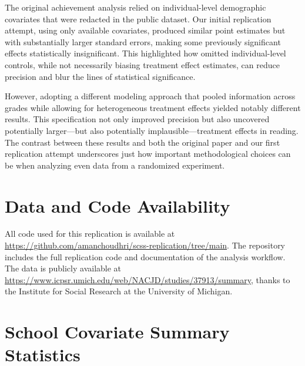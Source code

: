 \documentclass[11pt]{article}
\begin{document}
The original achievement analysis relied on individual-level demographic
covariates that were redacted in the public dataset. Our initial replication
attempt, using only available covariates, produced similar point estimates but
with substantially larger standard errors, making some previously significant
effects statistically insignificant. This highlighted how omitted
individual-level controls, while not necessarily biasing treatment effect
estimates, can reduce precision and blur the lines of statistical significance.

However, adopting a different modeling approach that pooled information
across grades while allowing for heterogeneous treatment effects yielded
notably different results. This specification not only improved precision but
also uncovered potentially larger—but also potentially implausible—treatment
effects in reading. The contrast between these results and both the original paper and our first
replication attempt underscores just how important methodological choices can be when
analyzing even data from a randomized experiment.

\section*{Data and Code Availability}
All code used for this replication is available at
\url{https://github.com/amanchoudhri/scss-replication/tree/main}. The
repository includes the full replication code and documentation of the analysis
workflow. The data is publicly available at
\url{https://www.icpsr.umich.edu/web/NACJD/studies/37913/summary}, thanks to
the Institute for Social Research at the University of Michigan.

\printbibliography

\appendix

\section{School Covariate Summary Statistics}


\end{document}
